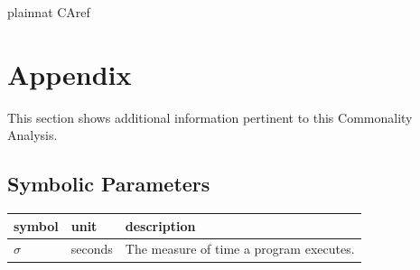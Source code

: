 \documentclass[12pt]{article}
\begin{document}
\newpage

 {plainnat}
 {CAref}

\newpage

\section{Appendix}
This section shows additional information pertinent to this Commonality Analysis.


\subsection{Symbolic Parameters}

\renewcommand{\arraystretch}{1.2}
\noindent \begin{longtable*}{l l p{12cm}} \toprule
\textbf{symbol} & \textbf{unit} & \textbf{description}\\
\midrule
$\sigma$ & seconds & The measure of time a program executes.\\

\bottomrule
\end{longtable*}

\end{document}
